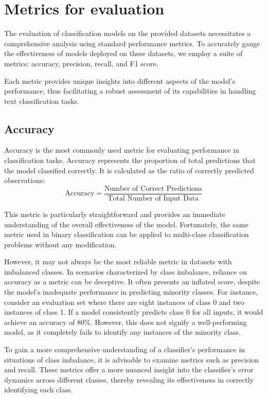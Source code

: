
\section{Metrics for evaluation}
\label{sec:metrics}

The evaluation of classification models on the provided datasets necessitates a comprehensive analysis using standard performance metrics. To accurately gauge the effectiveness of models deployed on these datasets, we employ a suite of metrics: accuracy, precision, recall, and F1 score.

Each metric provides unique insights into different aspects of the model's performance, thus facilitating a robust assessment of its capabilities in handling text classification tasks.

\subsection{Accuracy}

Accuracy is the most commonly used metric for evaluating performance in classification tasks. Accuracy represents the proportion of total predictions that the model classified correctly. It is calculated as the ratio of correctly predicted observations:
$$
    \text{Accuracy} = \frac{\text{Number of Correct Predictions}}{\text{Total Number of Input Data}}
$$

This metric is particularly straightforward and provides an immediate understanding of the overall effectiveness of the model. Fortunately, the same metric used in binary classification can be applied to multi-class classification problems without any modification.

However, it may not always be the most reliable metric in datasets with imbalanced classes. In scenarios characterized by class imbalance, reliance on accuracy as a metric can be deceptive. It often presents an inflated score, despite the model's inadequate performance in predicting minority classes. For instance, consider an evaluation set where there are eight instances of class 0 and two instances of class 1. If a model consistently predicts class 0 for all inputs, it would achieve an accuracy of $80\%$. However, this does not signify a well-performing model, as it completely fails to identify any instances of the minority class.

To gain a more comprehensive understanding of a classifier's performance in situations of class imbalance, it is advisable to examine metrics such as precision and recall. These metrics offer a more nuanced insight into the classifier's error dynamics across different classes, thereby revealing its effectiveness in correctly identifying each class.

